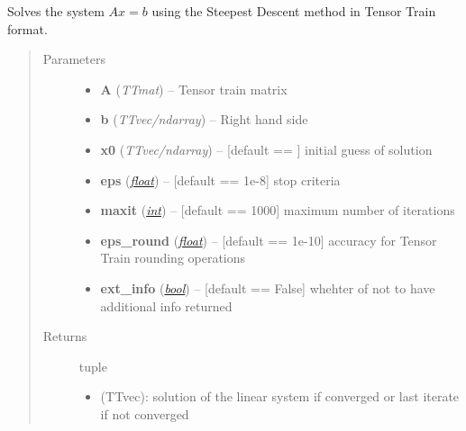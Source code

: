 \documentclass[a4paper,10pt,english]{sphinxmanual}
\begin{document}

\begin{fulllineitems}
\label{api-multilinalg:TensorToolbox.multilinalg.sd}
Solves the system \(Ax=b\) using the Steepest Descent method in Tensor Train format.
\begin{quote}\begin{description}
\item[{Parameters}] \leavevmode\begin{itemize}
\item {} 
\textbf{A} (\emph{TTmat}) -- Tensor train matrix

\item {} 
\textbf{b} (\emph{TTvec/ndarray}) -- Right hand side

\item {} 
\textbf{x0} (\emph{TTvec/ndarray}) -- {[}default == {\hyperref[api-core:TensorToolbox.core.zerosvec]{}}{]} initial guess of solution 

\item {} 
\textbf{eps} (\href{http://docs.python.org/library/functions.html\#float}{\emph{float}}) -- {[}default == 1e-8{]} stop criteria

\item {} 
\textbf{maxit} (\href{http://docs.python.org/library/functions.html\#int}{\emph{int}}) -- {[}default == 1000{]} maximum number of iterations

\item {} 
\textbf{eps\_round} (\href{http://docs.python.org/library/functions.html\#float}{\emph{float}}) -- {[}default == 1e-10{]} accuracy for Tensor Train rounding operations

\item {} 
\textbf{ext\_info} (\href{http://docs.python.org/library/functions.html\#bool}{\emph{bool}}) -- {[}default == False{]} whehter of not to have additional info returned

\end{itemize}

\item[{Returns}] \leavevmode

tuple 
\begin{itemize}
\item {} 
 (TTvec): solution of the linear system if converged or last iterate if not converged


\end{itemize}
\end{description}
\end{quote}
\end{fulllineitems}
\end{document}
